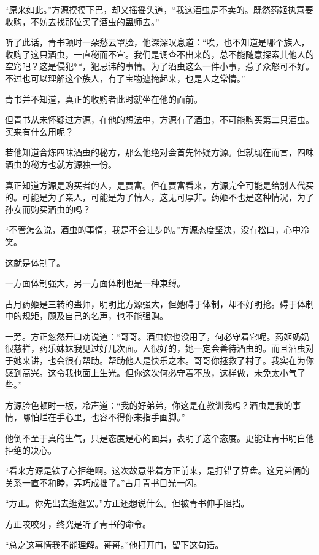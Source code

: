 
\begin{this_body}

“原来如此。”方源摸摸下巴，却又摇摇头道，“我这酒虫是不卖的。既然药姬执意要收购，不妨去找那位买了酒虫的蛊师去。”

听了此话，青书顿时一朵愁云罩脸，他深深叹息道：“唉，也不知道是哪个族人，收购了这只酒虫，一直秘而不宣。我们是调查不出来的，总不能随意探索其他人的空窍吧？这是侵犯**，犯忌讳的事情。为了酒虫这么一件小事，惹了众怒可不好。不过也可以理解这个族人，有了宝物遮掩起来，也是人之常情。”

青书并不知道，真正的收购者此时就坐在他的面前。

但青书从未怀疑过方源，在他的想法中，方源有了酒虫，不可能购买第二只酒虫。买来有什么用呢？

若他知道合炼四味酒虫的秘方，那么他绝对会首先怀疑方源。但就现在而言，四味酒虫的秘方也就方源独一份。

真正知道方源是购买者的人，是贾富。但在贾富看来，方源完全可能是给别人代买的。可能是为了亲人，可能是为了情人，这无可厚非。药姬不也是这种情况，为了孙女而购买酒虫的吗？

“不管怎么说，酒虫的事情，我是不会让步的。”方源态度坚决，没有松口，心中冷笑。

这就是体制了。

一方面体制强大，另一方面体制也是一种束缚。

古月药姬是三转的蛊师，明明比方源强大，但她碍于体制，却不好明抢。碍于体制中的规矩，顾及自己的名声，也不能强购。

一旁。方正忽然开口劝说道：“哥哥。酒虫你也没用了，何必守着它呢。药姬奶奶很慈祥，药乐妹妹我见过好几次面。人很好的，她一定会善待酒虫的。而且酒虫对于她来讲，也会很有帮助。帮助他人是快乐之本。哥哥你拯救了村子。我实在为你感到高兴。这令我也面上生光。但你这次何必守着不放，这样做，未免太小气了些。”

方源脸色顿时一板，冷声道：“我的好弟弟，你这是在教训我吗？酒虫是我的事情，哪怕烂在手心里，也容不得你来指手画脚。”

他倒不至于真的生气，只是态度是心的面具，表明了这个态度。更能让青书明白他拒绝的决心。

“看来方源是铁了心拒绝啊。这次故意带着方正前来，是打错了算盘。这兄弟俩的关系一直不和睦，弄巧成拙了。”古月青书目光一闪。

“方正。你先出去逛逛罢。”方正还想说什么。但被青书伸手阻挡。

方正咬咬牙，终究是听了青书的命令。

“总之这事情我不能理解。哥哥。”他打开门，留下这句话。


\end{this_body}
